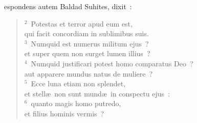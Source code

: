 \bchapter
{}espondens autem Baldad Suhites, dixit~:
\begin{flushleft}\begin{verse}\vspace{6pt}${}^{2}$~Potestas et terror apud eum est,\\ qui facit concordiam in sublimibus suis.\\
${}^{3}$~Numquid est numerus militum ejus~?\\ et super quem non surget lumen illius~?\\
${}^{4}$~Numquid justificari potest homo comparatus Deo~?\\ aut apparere mundus natus de muliere~?\\
${}^{5}$~Ecce luna etiam non splendet,\\ et stell\ae\ non sunt mund\ae\ in conspectu ejus~:\\
${}^{6}$~quanto magis homo putredo,\\ et filius hominis vermis~?\end{verse}\end{flushleft}



